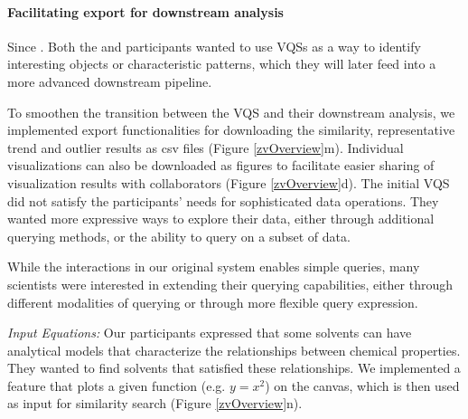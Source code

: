 \paragraph{Facilitating export for downstream analysis}
\par Since . Both the \astro and \bio participants wanted to use VQSs as a way to identify interesting objects or characteristic patterns, which they will later feed into a more advanced downstream pipeline. 
\par To smoothen the transition between the VQS and their downstream analysis, we implemented export functionalities for downloading the similarity, representative trend and outlier results as csv files (Figure \ref{zvOverview}m). Individual visualizations can also be downloaded as figures to facilitate easier sharing of visualization results with collaborators (Figure \ref{zvOverview}d). 
The initial VQS did not satisfy the participants' needs for sophisticated data operations. They wanted more expressive ways to explore their data, either through additional querying methods, or the ability to query on a subset of data.
\par While the interactions in our original system enables simple queries, many scientists were interested in extending their querying capabilities, either through different modalities of querying or through more flexible query expression.  
\par \textit{Input Equations:} Our \matsci participants expressed that some solvents can have analytical models that characterize the relationships between chemical properties. They wanted to find solvents that satisfied these relationships. We implemented a feature that plots a given function (e.g. $y=x^2$) on the canvas, which is then used as input for similarity search (Figure \ref{zvOverview}n).
